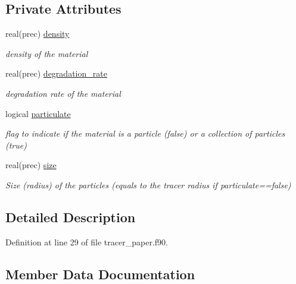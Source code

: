 \subsection*{Private Attributes}
\begin{DoxyCompactItemize}
\item 
real(prec) \mbox{\hyperlink{structtracer__paper__mod_1_1paper__par__class_ace47f01093c339db1b5514f136a98c25}{density}}
\begin{DoxyCompactList}\small\item\em density of the material \end{DoxyCompactList}\item 
real(prec) \mbox{\hyperlink{structtracer__paper__mod_1_1paper__par__class_ac9893368ff4ec076f4604d749c2bb391}{degradation\+\_\+rate}}
\begin{DoxyCompactList}\small\item\em degradation rate of the material \end{DoxyCompactList}\item 
logical \mbox{\hyperlink{structtracer__paper__mod_1_1paper__par__class_a794fb1c69237803f68cb68143273242c}{particulate}}
\begin{DoxyCompactList}\small\item\em flag to indicate if the material is a particle (false) or a collection of particles (true) \end{DoxyCompactList}\item 
real(prec) \mbox{\hyperlink{structtracer__paper__mod_1_1paper__par__class_aeb0b4d046983cd2f631822e80e1600c4}{size}}
\begin{DoxyCompactList}\small\item\em Size (radius) of the particles (equals to the tracer radius if particulate==false) \end{DoxyCompactList}\end{DoxyCompactItemize}


\subsection{Detailed Description}


Definition at line 29 of file tracer\+\_\+paper.\+f90.



\subsection{Member Data Documentation}
\mbox{\label{structtracer__paper__mod_1_1paper__par__class_ac9893368ff4ec076f4604d749c2bb391}} 
